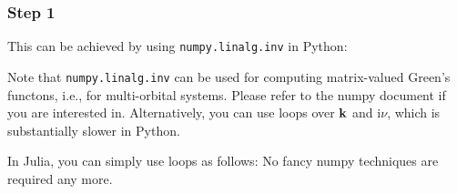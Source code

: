 \documentclass[submission, LectureNotes]{SciPost}
\newcommand{\bk}{\ensuremath{{\bf k}}}
\newcommand\ii{\mathrm{i}}%
\newcommand\iv{\ii\nu}%
\begin{document}
\subsubsection{Step 1}
This can be achieved by using \texttt{numpy.linalg.inv} in Python:
\begin{python}
\end{python}
Note that \texttt{numpy.linalg.inv} can be used for computing matrix-valued Green's functons, i.e., for multi-orbital systems.
Please refer to the numpy document if you are interested in.
Alternatively, you can use loops over $\bk$ and $\iv$, which is substantially slower in Python.

In Julia, you can simply use loops as follows:
No fancy numpy techniques are required any more.
\end{document}
